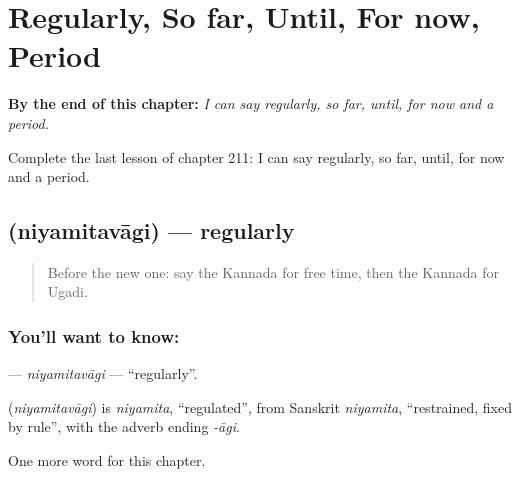 
\chapter{Regularly, So far, Until, For now, Period}
\label{ch:ka-regularly-so-far-until-for-now-period}

\begin{chapteropening}
\textbf{By the end of this chapter:} \emph{I can say regularly, so far, until, for now and a period.}

Complete the last lesson of chapter 211: I can say regularly, so far, until, for now and a period.
\end{chapteropening}

\section[\texorpdfstring{\kn{ನಿಯಮಿತವಾಗಿ} (niyamitavāgi)}{ನಿಯಮಿತವಾಗಿ (niyamitavāgi)}]{ (niyamitavāgi) — regularly}

\label{lesson:KA-C211-niyamitavagi}



\begin{quote}
Before the new one: say the Kannada for free time, then the Kannada for Ugadi.
\end{quote}

\subsection*{You'll want to know: }
\textbf{} — \emph{niyamitavāgi} — \textquotedblleft{}regularly\textquotedblright{}.

\begin{cousinweb}
\textbf{} (\emph{niyamitavāgi}) is \emph{niyamita}, \textquotedblleft{}regulated\textquotedblright{}, from Sanskrit \emph{niyamita}, \textquotedblleft{}restrained, fixed by rule\textquotedblright{}, with the adverb ending \emph{-āgi}.
\end{cousinweb}

\begin{grammarlens}[title={What you've built}]
One more word for this chapter.
\end{grammarlens}

